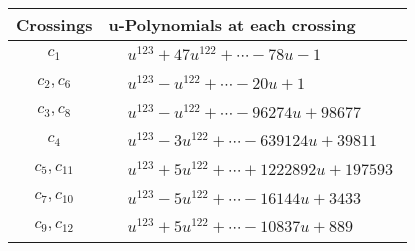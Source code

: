 \documentclass[1p]{elsarticle_modified}
\theoremstyle{definition}
\begin{document}
\begin{tabular}{m{50pt}|m{274pt}}
Crossings & \hspace{64pt}u-Polynomials at each crossing \\
\hline $$\begin{aligned}c_{1}\end{aligned}$$&$\begin{aligned}
&u^{123}+47 u^{122}+\cdots-78 u-1
\end{aligned}$\\
\hline $$\begin{aligned}c_{2},c_{6}\end{aligned}$$&$\begin{aligned}
&u^{123}- u^{122}+\cdots-20 u+1
\end{aligned}$\\
\hline $$\begin{aligned}c_{3},c_{8}\end{aligned}$$&$\begin{aligned}
&u^{123}- u^{122}+\cdots-96274 u+98677
\end{aligned}$\\
\hline $$\begin{aligned}c_{4}\end{aligned}$$&$\begin{aligned}
&u^{123}-3 u^{122}+\cdots-639124 u+39811
\end{aligned}$\\
\hline $$\begin{aligned}c_{5},c_{11}\end{aligned}$$&$\begin{aligned}
&u^{123}+5 u^{122}+\cdots+1222892 u+197593
\end{aligned}$\\
\hline $$\begin{aligned}c_{7},c_{10}\end{aligned}$$&$\begin{aligned}
&u^{123}-5 u^{122}+\cdots-16144 u+3433
\end{aligned}$\\
\hline $$\begin{aligned}c_{9},c_{12}\end{aligned}$$&$\begin{aligned}
&u^{123}+5 u^{122}+\cdots-10837 u+889
\end{aligned}$\\
\hline
\end{tabular}\\~\\
\end{document}
